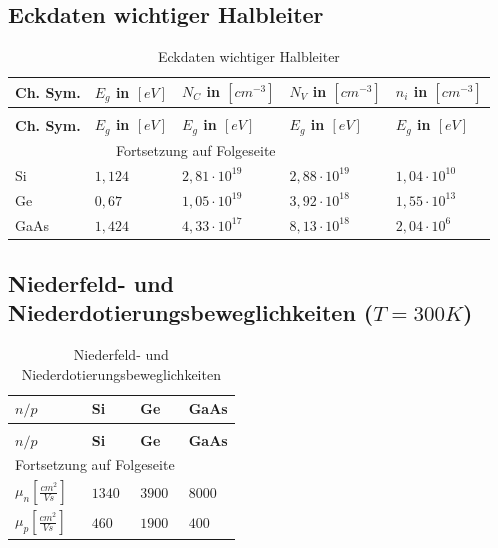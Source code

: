 \documentclass[12pt,a4paper]{report}%
\numberwithin{equation}{section}
\def\bracks#1{\left[ #1 \right]}
\numberwithin{equation}{subsection}
\begin{document}
	\subsection{Eckdaten wichtiger Halbleiter} \label{ch:eckd}
	\renewcommand{\arraystretch}{1.5}
	\begin{longtable} {|p{2cm}|p{2.6cm}|p{2.6cm}|p{2.6cm}|p{2.7cm}|} \hline
	\textbf{Ch. Sym.} & \textbf{$E_g$ in $\bracks{eV}$} & \textbf{$N_C$ in $\bracks{cm^{-3}}$} & \textbf{$N_V$ in $\bracks{cm^{-3}}$} & \textbf{$n_i$ in $\bracks{cm^{-3}}$} \\
	\hline
	\endfirsthead %
	\caption{Eckdaten wichtiger Halbleiter}\\ \hline
	\textbf{Ch. Sym.} & \textbf{$E_g$ in $\bracks{eV}$} & \textbf{$E_g$ in $\bracks{eV}$} & \textbf{$E_g$ in $\bracks{eV}$} & \textbf{$E_g$ in $\bracks{eV}$} \\
	\hline
	\endhead %
	\multicolumn{3}{r}{Fortsetzung auf Folgeseite}\\
	\endfoot
	\hline
	\endlastfoot
	Si & $1,124$ & $2,81 \cdot 10^{19}$ & $2,88 \cdot 10^{19}$ & $1,04 \cdot 10^{10}$ \\ \hline
	Ge & $0,67$ & $1,05 \cdot 10^{19}$ & $3,92 \cdot 10^{18}$ & $1,55 \cdot 10^{13}$ \\ \hline
	GaAs & $1,424$ & $4,33 \cdot 10^{17}$ & $8,13 \cdot 10^{18}$ & $2,04 \cdot 10^{6}$ \\ \hline
	\end{longtable}
	\renewcommand{\arraystretch}{1}
	\newpage
\subsection{Niederfeld- und Niederdotierungsbeweglichkeiten ($T = 300K$)} \label{ch:bewegl.}
	\renewcommand{\arraystretch}{1.5}
	\begin{longtable} {|p{2.4cm}|p{3.5cm}|p{3.5cm}|p{3.5cm}|} \hline
	\textbf{$n/p$} & \textbf{Si} & \textbf{Ge} & \textbf{GaAs} \\
	\hline
	\endfirsthead %
	\caption{Niederfeld- und Niederdotierungsbeweglichkeiten}\\ \hline
	\textbf{$n/p$} & \textbf{Si} & \textbf{Ge} & \textbf{GaAs} \\
	\hline
	\endhead %
	\multicolumn{3}{r}{Fortsetzung auf Folgeseite}\\
	\endfoot
	\hline
	\endlastfoot
	  $\mu_n \bracks{\frac{cm^2}{Vs}}$ & $1340$ & $3900$ & $8000$ \\ \hline	
	  $\mu_p \bracks{\frac{cm^2}{Vs}}$ & $460$ & $1900$ & $400$ \\ \hline	
	\end{longtable}
	\renewcommand{\arraystretch}{1}	
	
\end{document}
